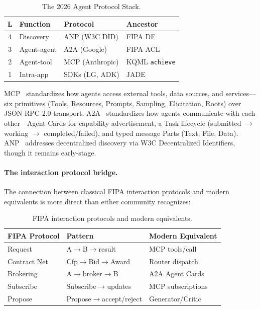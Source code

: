 \documentclass{article}
\begin{document}
\begin{table}[h]
\centering
\caption{The 2026 Agent Protocol Stack.}
\label{tab:protocol-stack}
\small
\begin{tabular}{@{} c p{1.5cm} p{2cm} p{2cm} @{}}
\toprule
\textbf{L} & \textbf{Function} & \textbf{Protocol} & \textbf{Ancestor} \\
\midrule
4 & Discovery & ANP (W3C DID) & FIPA DF \\
3 & Agent-agent & A2A (Google) & FIPA ACL \\
2 & Agent-tool & MCP (Anthropic) & KQML \texttt{achieve} \\
1 & Intra-app & SDKs (LG, ADK) & JADE \\
\bottomrule
\end{tabular}
\end{table}

MCP~\citep{mcpspec2025} standardizes how agents access external tools, data sources, and
services---six primitives (Tools, Resources, Prompts, Sampling, Elicitation, Roots) over
JSON-RPC 2.0 transport. A2A~\citep{a2aspec2025} standardizes how agents communicate with
each other---Agent Cards for capability advertisement, a Task lifecycle
(submitted $\to$ working $\to$ completed/failed), and typed message Parts (Text, File,
Data). ANP~\citep{anpspec2025} addresses decentralized discovery via W3C Decentralized
Identifiers, though it remains early-stage.

\paragraph{The interaction protocol bridge.}
The connection between classical FIPA interaction protocols and modern equivalents is
more direct than either community recognizes:

\begin{table}[h]
\centering
\caption{FIPA interaction protocols and modern equivalents.}
\label{tab:fipa-modern}
\scriptsize
\begin{tabular}{@{} l l l @{}}
\toprule
\textbf{FIPA Protocol} & \textbf{Pattern} & \textbf{Modern Equivalent} \\
\midrule
Request & A$\to$B$\to$result & MCP tools/call \\
Contract Net & Cfp$\to$Bid$\to$Award & Router dispatch \\
Brokering & A$\to$broker$\to$B & A2A Agent Cards \\
Subscribe & Subscribe$\to$updates & MCP subscriptions \\
Propose & Propose$\to$accept/reject & Generator/Critic \\
\bottomrule
\end{tabular}
\end{table}
\end{document}

